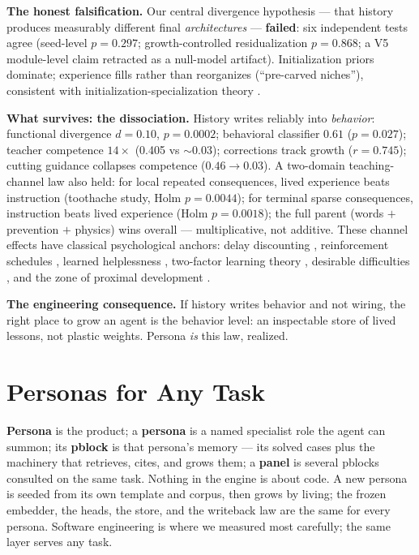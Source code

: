 \documentclass[11pt]{article}
\begin{document}
\textbf{The honest falsification.} Our central divergence hypothesis --- that history produces measurably different final \emph{architectures} --- \textbf{failed}: six independent tests agree (seed-level $p{=}0.297$; growth-controlled residualization $p{=}0.868$; a V5 module-level claim retracted as a null-model artifact). Initialization priors dominate; experience fills rather than reorganizes (``pre-carved niches''), consistent with initialization-specialization theory \cite{jarvis2025specialisation}.

\textbf{What survives: the dissociation.} History writes reliably into \emph{behavior}: functional divergence $d{=}0.10$, $p{=}0.0002$; behavioral classifier $0.61$ ($p{=}0.027$); teacher competence $14\times$ (0.405 vs ${\sim}0.03$); corrections track growth ($r{=}0.745$); cutting guidance collapses competence ($0.46\to0.03$). A two-domain teaching-channel law also held: for local repeated consequences, lived experience beats instruction (toothache study, Holm $p{=}0.0044$); for terminal sparse consequences, instruction beats lived experience (Holm $p{=}0.0018$); the full parent (words $+$ prevention $+$ physics) wins overall --- multiplicative, not additive. These channel effects have classical psychological anchors: delay discounting \cite{ainslie1975specious}, reinforcement schedules \cite{ferster1957schedules}, learned helplessness \cite{seligman1967failure}, two-factor learning theory \cite{mowrer1947dual}, desirable difficulties \cite{bjork1994memory}, and the zone of proximal development \cite{vygotsky1978mind,wood1976role}.

\textbf{The engineering consequence.} If history writes behavior and not wiring, the right place to grow an agent is the behavior level: an inspectable store of lived lessons, not plastic weights. Persona \emph{is} this law, realized.

\section{Personas for Any Task}
\label{sec:personas}
\textbf{Persona} is the product; a \textbf{persona} is a named specialist role the agent can summon; its \textbf{pblock} is that persona's memory --- its solved cases plus the machinery that retrieves, cites, and grows them; a \textbf{panel} is several pblocks consulted on the same task. Nothing in the engine is about code. A new persona is seeded from its own template and corpus, then grows by living; the frozen embedder, the heads, the store, and the writeback law are the same for every persona. Software engineering is where we measured most carefully; the same layer serves any task.
\end{document}
